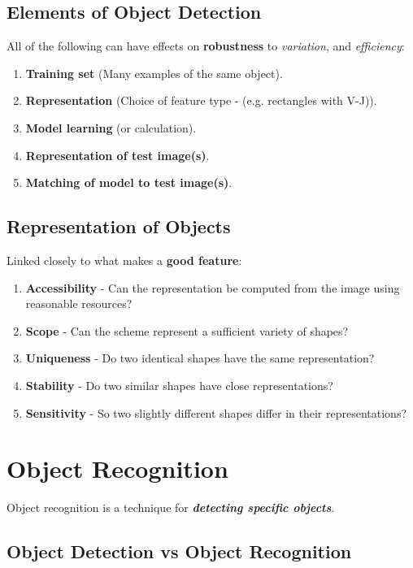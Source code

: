 \documentclass[english, 10pt]{article}
\begin{document}
\subsection{Elements of Object Detection}

All of the following can have effects on \textbf{robustness} to \textit{variation}, and \textit{efficiency}:

\begin{enumerate}
\item \textbf{Training set} (Many examples of the same object). 
\item \textbf{Representation} (Choice of feature type - (e.g. rectangles with V-J)).
\item \textbf{Model learning} (or calculation).
\item \textbf{Representation of test image(s)}.
\item \textbf{Matching of model to test image(s)}.
\end{enumerate}

\subsection{Representation of Objects}

Linked closely to what makes a \textbf{good feature}:

\begin{enumerate}
\item \textbf{Accessibility} - Can the representation be computed from the image using reasonable resources?
\item \textbf{Scope} - Can the scheme represent a sufficient variety of shapes?
\item \textbf{Uniqueness} - Do two identical shapes have the same representation?
\item \textbf{Stability} - Do two similar shapes have close representations?
\item \textbf{Sensitivity} - So two slightly different shapes differ in their representations?
\end{enumerate}

\section{Object Recognition}

Object recognition is a technique for \textbf{\textit{detecting specific objects}}.

\subsection{Object Detection vs Object Recognition}
\end{document}
